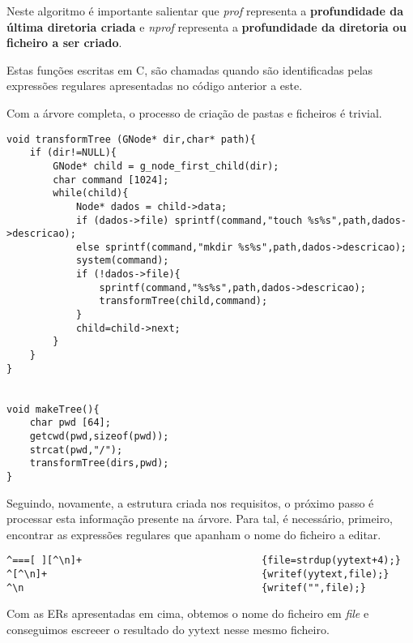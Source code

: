 \documentclass[12pt]{article}
\begin{document}
Neste algoritmo é importante salientar que \textit{prof} representa a \textbf{profundidade da última diretoria criada} e \textit{nprof} representa a \textbf{profundidade da diretoria ou ficheiro a ser criado}.

Estas funções escritas em C, são chamadas quando são identificadas pelas expressões regulares apresentadas no código anterior a este.

Com a árvore completa, o processo de criação de pastas e ficheiros é trivial.

\begin{verbatim}
void transformTree (GNode* dir,char* path){
    if (dir!=NULL){
        GNode* child = g_node_first_child(dir);
        char command [1024];
        while(child){
            Node* dados = child->data;
            if (dados->file) sprintf(command,"touch %s%s",path,dados->descricao);
            else sprintf(command,"mkdir %s%s",path,dados->descricao);
            system(command);
            if (!dados->file){
                sprintf(command,"%s%s",path,dados->descricao);
                transformTree(child,command);
            }
            child=child->next;
        }
    }
}


void makeTree(){
    char pwd [64];
    getcwd(pwd,sizeof(pwd));
    strcat(pwd,"/");
    transformTree(dirs,pwd);
}
\end{verbatim}

Seguindo, novamente, a estrutura criada nos requisitos, o próximo passo é processar esta informação presente na árvore. Para tal, é necessário, primeiro, encontrar as expressões regulares que apanham o nome do ficheiro a editar.

\begin{tcolorbox}
\begin{verbatim}
^===[ ][^\n]+                               {file=strdup(yytext+4);}
^[^\n]+                                     {writef(yytext,file);}
^\n                                         {writef("",file);}
\end{verbatim}
\end{tcolorbox}

Com as ERs apresentadas em cima, obtemos o nome do ficheiro em \textit{file} e conseguimos escreeer o resultado do yytext nesse mesmo ficheiro.
\end{document}
